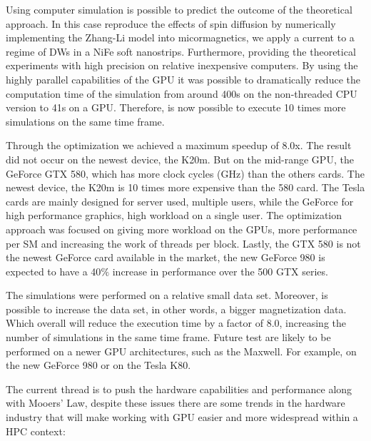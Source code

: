 Using computer simulation is possible to predict the outcome of the theoretical approach. In this case reproduce the effects of spin diffusion by numerically implementing the Zhang-Li model into micormagnetics, we apply a current to a regime of DWs in a NiFe soft nanostrips. Furthermore, providing the theoretical experiments with high precision on relative inexpensive computers. By using the highly parallel capabilities of the GPU it was possible to dramatically reduce the computation time of the simulation from around 400s on the non-threaded CPU version to 41s on a GPU. Therefore, is now possible to execute 10 times more simulations on the same time frame.

Through the optimization we achieved a maximum speedup of 8.0x. The result did not occur on the newest device, the K20m. But on the mid-range GPU, the GeForce GTX 580, which has more clock cycles (GHz) than the others cards. The newest device, the K20m is 10 times more expensive than the 580 card. The Tesla cards are mainly designed for server used, multiple users, while the GeForce for high performance graphics, high workload on a single user. The  optimization approach was focused on giving more workload on the GPUs, more performance per SM and increasing the work of threads per block. Lastly, the GTX 580 is not the newest GeForce card available in the market, the new GeForce 980 is expected to have a 40$\%$ increase in performance over the 500 GTX series. 

The simulations were performed on a relative small data set. Moreover, is possible to increase the data set, in other words, a bigger magnetization data. Which overall will reduce the execution time by a factor of 8.0, increasing the number of simulations in the same time frame. Future test are likely to be performed on a newer GPU architectures, such as the Maxwell. For example, on the new GeForce 980 or on the Tesla K80.

The current thread is to push the hardware capabilities and performance along with Mooers' Law, despite these issues there are some trends in the hardware industry that will make working with GPU easier and more widespread within a HPC context:

